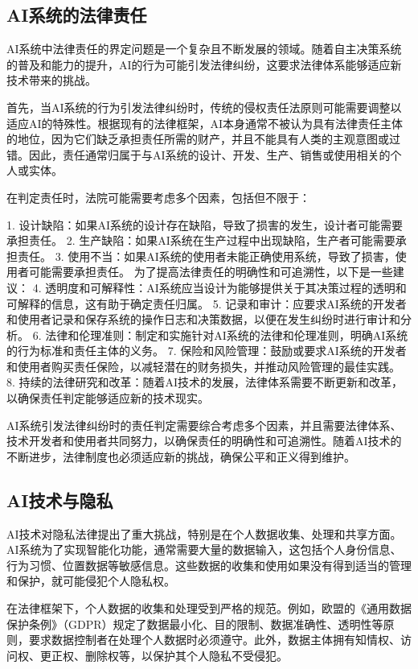 \subsection{AI系统的法律责任}

AI系统中法律责任的界定问题是一个复杂且不断发展的领域。随着自主决策系统的普及和能力的提升，AI的行为可能引发法律纠纷，这要求法律体系能够适应新技术带来的挑战。

首先，当AI系统的行为引发法律纠纷时，传统的侵权责任法原则可能需要调整以适应AI的特殊性。根据现有的法律框架，AI本身通常不被认为具有法律责任主体的地位，因为它们缺乏承担责任所需的财产，并且不能具有人类的主观意图或过错。因此，责任通常归属于与AI系统的设计、开发、生产、销售或使用相关的个人或实体。

在判定责任时，法院可能需要考虑多个因素，包括但不限于：

1. 设计缺陷：如果AI系统的设计存在缺陷，导致了损害的发生，设计者可能需要承担责任。
2. 生产缺陷：如果AI系统在生产过程中出现缺陷，生产者可能需要承担责任。
3. 使用不当：如果AI系统的使用者未能正确使用系统，导致了损害，使用者可能需要承担责任。
为了提高法律责任的明确性和可追溯性，以下是一些建议：
4. 透明度和可解释性：AI系统应当设计为能够提供关于其决策过程的透明和可解释的信息，这有助于确定责任归属。
5. 记录和审计：应要求AI系统的开发者和使用者记录和保存系统的操作日志和决策数据，以便在发生纠纷时进行审计和分析。
6. 法律和伦理准则：制定和实施针对AI系统的法律和伦理准则，明确AI系统的行为标准和责任主体的义务。
7. 保险和风险管理：鼓励或要求AI系统的开发者和使用者购买责任保险，以减轻潜在的财务损失，并推动风险管理的最佳实践。
8. 持续的法律研究和改革：随着AI技术的发展，法律体系需要不断更新和改革，以确保责任判定能够适应新的技术现实。

AI系统引发法律纠纷时的责任判定需要综合考虑多个因素，并且需要法律体系、技术开发者和使用者共同努力，以确保责任的明确性和可追溯性。随着AI技术的不断进步，法律制度也必须适应新的挑战，确保公平和正义得到维护。

\subsection{AI技术与隐私}

AI技术对隐私法律提出了重大挑战，特别是在个人数据收集、处理和共享方面。AI系统为了实现智能化功能，通常需要大量的数据输入，这包括个人身份信息、行为习惯、位置数据等敏感信息。这些数据的收集和使用如果没有得到适当的管理和保护，就可能侵犯个人隐私权。

在法律框架下，个人数据的收集和处理受到严格的规范。例如，欧盟的《通用数据保护条例》（GDPR）规定了数据最小化、目的限制、数据准确性、透明性等原则，要求数据控制者在处理个人数据时必须遵守。此外，数据主体拥有知情权、访问权、更正权、删除权等，以保护其个人隐私不受侵犯。


